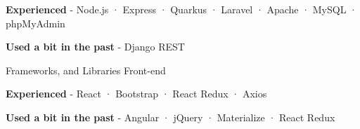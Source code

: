 \begin{cventries}
{\begin{cvitems}
    \item {\textbf{Experienced} \hspace{0.03cm} - \hspace{0.03cm} Node.js \hspace{0.03cm} · \hspace{0.03cm} Express \hspace{0.03cm} · \hspace{0.03cm} Quarkus \hspace{0.03cm} · \hspace{0.03cm} Laravel \hspace{0.03cm} · \hspace{0.03cm} Apache \hspace{0.03cm} · \hspace{0.03cm} MySQL \hspace{0.03cm} · \hspace{0.03cm} phpMyAdmin} %
    \item {\textbf{Used a bit in the past} \hspace{0.03cm} - \hspace{0.03cm} Django REST \\} %
  \end{cvitems}
}
  \cventry
    {Frameworks, and Libraries} %
    {Front-end} %
    {} %
    {} %
    {
      \begin{cvitems} %
        \item {\textbf{Experienced} \hspace{0.03cm} - \hspace{0.03cm} React \hspace{0.03cm} · \hspace{0.03cm} Bootstrap \hspace{0.03cm} · \hspace{0.03cm} React Redux \hspace{0.03cm} · \hspace{0.03cm} Axios} %
        \item {\textbf{Used a bit in the past} \hspace{0.03cm} - \hspace{0.03cm} Angular \hspace{0.03cm} · \hspace{0.03cm} jQuery \hspace{0.03cm} · \hspace{0.03cm} Materialize \hspace{0.03cm} · \hspace{0.03cm} React Redux \\} %

\end{cvitems}}
\end{cventries}
